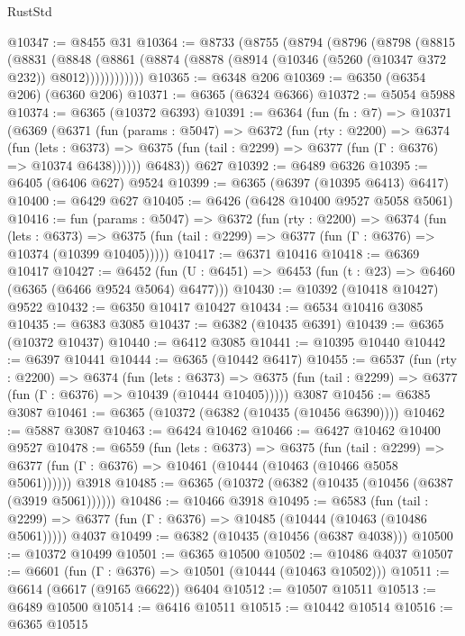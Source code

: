 \begin{lexlean}{RustStd}
\begin{coremodule}
@10347 := @8455 @31
@10364 := @8733
    (@8755
      (@8794
        (@8796
          (@8798
            (@8815
              (@8831
                (@8848
                  (@8861 (@8874 (@8878 (@8914 (@10346 (@5260 (@10347 @372 @232)) @8012))))))))))))
@10365 := @6348 @206
@10369 := @6350 (@6354 @206) (@6360 @206)
@10371 := @6365 (@6324 @6366)
@10372 := @5054 @5988
@10374 := @6365 (@10372 @6393)
@10391 := @6364
    (fun (fn : @7) =>
    @10371
      (@6369
        (@6371
          (fun (params : @5047) =>
          @6372
            (fun (rty : @2200) =>
            @6374
              (fun (lets : @6373) =>
              @6375 (fun (tail : @2299) => @6377 (fun (Γ : @6376) => @10374 @6438))))))
        @6483))
    @627
@10392 := @6489 @6326
@10395 := @6405 (@6406 @627) @9524
@10399 := @6365 (@6397 (@10395 @6413) @6417)
@10400 := @6429 @627
@10405 := @6426 (@6428 @10400 @9527 @5058 @5061)
@10416 := fun (params : @5047) =>
  @6372
    (fun (rty : @2200) =>
    @6374
      (fun (lets : @6373) =>
      @6375 (fun (tail : @2299) => @6377 (fun (Γ : @6376) => @10374 (@10399 @10405)))))
@10417 := @6371 @10416
@10418 := @6369 @10417
@10427 := @6452
    (fun (U : @6451) => @6453 (fun (t : @23) => @6460 (@6365 (@6466 @9524 @5064) @6477)))
@10430 := @10392 (@10418 @10427) @9522
@10432 := @6350 @10417 @10427
@10434 := @6534 @10416 @3085
@10435 := @6383 @3085
@10437 := @6382 (@10435 @6391)
@10439 := @6365 (@10372 @10437)
@10440 := @6412 @3085
@10441 := @10395 @10440
@10442 := @6397 @10441
@10444 := @6365 (@10442 @6417)
@10455 := @6537
    (fun (rty : @2200) =>
    @6374
      (fun (lets : @6373) =>
      @6375 (fun (tail : @2299) => @6377 (fun (Γ : @6376) => @10439 (@10444 @10405)))))
    @3087
@10456 := @6385 @3087
@10461 := @6365 (@10372 (@6382 (@10435 (@10456 @6390))))
@10462 := @5887 @3087
@10463 := @6424 @10462
@10466 := @6427 @10462 @10400 @9527
@10478 := @6559
    (fun (lets : @6373) =>
    @6375
      (fun (tail : @2299) =>
      @6377 (fun (Γ : @6376) => @10461 (@10444 (@10463 (@10466 @5058 @5061))))))
    @3918
@10485 := @6365 (@10372 (@6382 (@10435 (@10456 (@6387 (@3919 @5061))))))
@10486 := @10466 @3918
@10495 := @6583
    (fun (tail : @2299) => @6377 (fun (Γ : @6376) => @10485 (@10444 (@10463 (@10486 @5061)))))
    @4037
@10499 := @6382 (@10435 (@10456 (@6387 @4038)))
@10500 := @10372 @10499
@10501 := @6365 @10500
@10502 := @10486 @4037
@10507 := @6601 (fun (Γ : @6376) => @10501 (@10444 (@10463 @10502)))
@10511 := @6614 (@6617 (@9165 @6622)) @6404
@10512 := @10507 @10511
@10513 := @6489 @10500
@10514 := @6416 @10511
@10515 := @10442 @10514
@10516 := @6365 @10515

\end{coremodule}
\end{lexlean}
